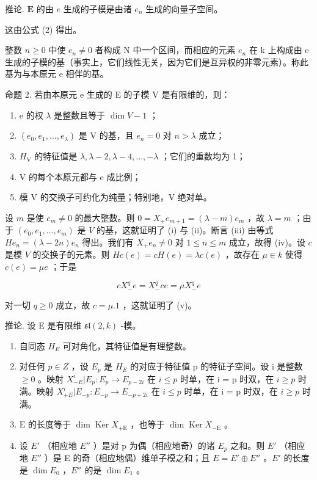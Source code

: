 推论. \(\mathbf{E}\) 的由 \(e\) 生成的子模是由诸 \(e_n\) 生成的向量子空间。

这由公式 (2) 得出。

整数 \(n \geq 0\) 中使 \(e_{n} \neq 0\) 者构成 N 中一个区间，而相应的元素 \(e_{n}\) 在 k 上构成由 e 生成的子模的基（事实上，它们线性无关，因为它们是互异权的非零元素）。称此基为与本原元 e 相伴的基。

命题 2. 若由本原元 e 生成的 E 的子模 V 是有限维的，则：

\begin{enumerate}
\def\labelenumi{(\roman{enumi})}
\item
  e 的权 \(\lambda\) 是整数且等于 \(\dim V - 1\) ；
\item
  \((e_0, e_1, \ldots, e_\lambda)\) 是 V 的基，且 \(e_n = 0\) 对 \(n > \lambda\) 成立；
\item
  \(H_{\mathrm{V}}\) 的特征值是 \(\lambda, \lambda - 2, \lambda - 4, \ldots, -\lambda\) ；它们的重数均为 1；
\item
  V 的每个本原元都与 e 成比例；
\item
  模 \(\mathrm{V}\) 的交换子可约化为纯量；特别地，\(\mathrm{V}\) 绝对单。
\end{enumerate}

设 \(m\) 是使 \(e_m \neq 0\) 的最大整数。则 \(0 = X_{+}e_{m+1} = (\lambda - m)e_m\) ，故 \(\lambda = m\) ；由于 \((e_0, e_1, \ldots, e_m)\) 是 \(V\) 的基，这就证明了 (i) 与 (ii)。断言 (iii) 由等式 \(He_n = (\lambda - 2n)e_n\) 得出。我们有 \(X_{+}e_n \neq 0\) 对 \(1 \leq n \leq m\) 成立，故得 (iv)。设 \(c\) 是模 \(V\) 的交换子的元素。则 \(Hc(e) = cH(e) = \lambda c(e)\) ，故存在 \(\mu \in k\) 使得 \(c(e) = \mu e\) ；于是

\[
c X _ {-} ^ {q} e = X _ {-} ^ {q} c e = \mu X _ {-} ^ {q} e
\]

对一切 \(q \geq 0\) 成立，故 \(c = \mu.1\) ，这就证明了 (v)。

推论. 设 E 是有限维 \(\mathfrak{sl}(2,k)\) -模。

\begin{enumerate}
\def\labelenumi{(\roman{enumi})}
\item
  自同态 \(H_{E}\) 可对角化，其特征值是有理整数。
\item
  对任何 \(p \in Z\) ，设 \(E_{p}\) 是 \(H_{E}\) 的对应于特征值 p 的特征子空间。设 i 是整数 \(\geq 0\) 。映射 \(X_{-E}^{i}|E_{p}:E_{p} \to E_{p-2i}\) 在 \(i \leq p\) 时单，在 i = p 时双，在 \(i \geq p\) 时满。映射 \(X_{+E}^{i}|E_{-p}:E_{-p} \to E_{-p+2i}\) 在 \(i \leq p\) 时单，在 i = p 时双，在 \(i \geq p\) 时满。
\item
  \(\mathrm{E}\) 的长度等于 \(\dim \operatorname{Ker} X_{+\mathrm{E}}\) ，也等于 \(\dim \operatorname{Ker} X_{-\mathrm{E}}\) 。
\item
  设 \(E'\) （相应地 \(E''\) ）是对 p 为偶（相应地奇）的诸 \(E_{p}\) 之和。则 \(E'\) （相应地 \(E''\) ）是 E 的奇（相应地偶）维单子模之和；且 \(E = E' \oplus E''\) 。\(E'\) 的长度是 \(\dim E_{0}\) ，\(E''\) 的是 \(\dim E_{1}\) 。
\end{enumerate}

